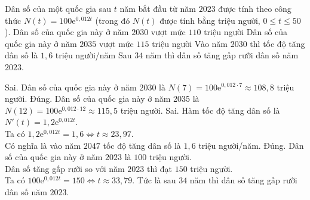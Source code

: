 \begin{ex}%
Dân số của một quốc gia sau $t$ năm bắt đầu từ năm $2023$ được tính theo công thức $N(t)=100\mathrm{e}^{0{,}012t}$ (trong đó $N(t)$ được tính bằng triệu người, $0\leq t\leq 50$).
\choiceTF
{Dân số của quốc gia này ở năm $2030$ vượt mức $110$ triệu người}
{\True Dân số của quốc gia này ở năm $2035$ vượt mức $115$ triệu người}
{Vào năm $2030$ thì tốc độ tăng dân số là $1{,}6$ triệu người/năm}
{\True Sau $34$ năm thì dân số tăng gấp rưỡi dân số năm $2023$.}
\loigiai
{
\begin{itemchoice}
\itemch Sai. Dân số của quốc gia này ở năm $2030$ là $N(7)=100\mathrm{e}^{0{,}012\cdot7}\approx 108{,}8$ triệu người.
\itemch Đúng. Dân số của quốc gia này ở năm 2035 là $N(12)=100\mathrm{e}^{0{,}012\cdot12}\approx 115{,}5$ triệu người.
\itemch Sai. Hàm tốc độ tăng dân số là $N'(t)=1{,}2\mathrm{e}^{0{,}012t}$. \\
Ta có $1{,}2\mathrm{e}^{0{,}012t}=1{,}6\Leftrightarrow t\approx23{,}97$. \\
Có nghĩa là vào năm $2047$ tốc độ tăng dân số là $1{,}6$ triệu người/năm.
\itemch Đúng. Dân số của quốc gia này ở năm $2023$ là $100$ triệu người.\\
Dân số tăng gấp rưỡi so với năm $2023$ thì đạt $150$ triệu người.\\
Ta có $100\mathrm{e}^{0{,}012t}=150\Leftrightarrow t\approx33{,}79$.
Tức là sau $34$ năm thì dân số tăng gấp rưỡi dân số năm $2023$.
\end{itemchoice}
}
\end{ex}

